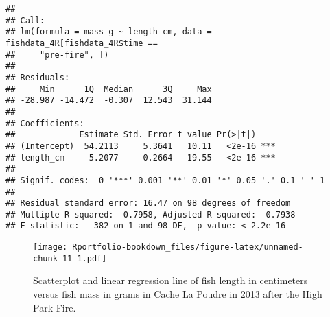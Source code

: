 \documentclass[
]{book}
\newenvironment{Shaded}{\begin{snugshade}}{\end{snugshade}}
\newcommand{\AttributeTok}[1]{\textcolor[rgb]{0.77,0.63,0.00}{#1}}
\newcommand{\CommentTok}[1]{\textcolor[rgb]{0.56,0.35,0.01}{\textit{#1}}}
\newcommand{\FunctionTok}[1]{\textcolor[rgb]{0.00,0.00,0.00}{#1}}
\newcommand{\NormalTok}[1]{#1}
\newcommand{\OtherTok}[1]{\textcolor[rgb]{0.56,0.35,0.01}{#1}}
\newcommand{\SpecialCharTok}[1]{\textcolor[rgb]{0.00,0.00,0.00}{#1}}
\newcommand{\StringTok}[1]{\textcolor[rgb]{0.31,0.60,0.02}{#1}}
\begin{document}
\begin{verbatim}
## 
## Call:
## lm(formula = mass_g ~ length_cm, data = fishdata_4R[fishdata_4R$time == 
##     "pre-fire", ])
## 
## Residuals:
##     Min      1Q  Median      3Q     Max 
## -28.987 -14.472  -0.307  12.543  31.144 
## 
## Coefficients:
##             Estimate Std. Error t value Pr(>|t|)    
## (Intercept)  54.2113     5.3641   10.11   <2e-16 ***
## length_cm     5.2077     0.2664   19.55   <2e-16 ***
## ---
## Signif. codes:  0 '***' 0.001 '**' 0.01 '*' 0.05 '.' 0.1 ' ' 1
## 
## Residual standard error: 16.47 on 98 degrees of freedom
## Multiple R-squared:  0.7958, Adjusted R-squared:  0.7938 
## F-statistic:   382 on 1 and 98 DF,  p-value: < 2.2e-16
\end{verbatim}

\begin{Shaded}
\end{Shaded}

\begin{figure}
\centering
\texttt{[image: Rportfolio-bookdown\_files/figure-latex/unnamed-chunk-11-1.pdf]}
\caption{\label{fig:unnamed-chunk-11}Scatterplot and linear regression line of fish length in centimeters versus fish mass in grams in Cache La Poudre in 2013 after the High Park Fire.}
\end{figure}
\end{document}
